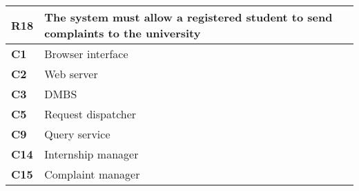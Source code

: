 \begin{table}[H]
    \centering
    \begin{tabular}{|l|m{10cm}|}
        \hline \textbf{R18} & The system must allow a registered student to send complaints to the university \\
        \hline \textbf{C1} & Browser interface \\
        \hline \textbf{C2} & Web server \\
        \hline \textbf{C3} & DMBS \\
        \hline \textbf{C5} & Request dispatcher \\
        \hline \textbf{C9} & Query service \\
        \hline \textbf{C14} & Internship manager \\
        \hline \textbf{C15} & Complaint manager \\
        \hline
    \end{tabular}
\end{table}

